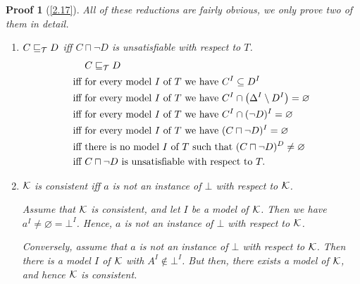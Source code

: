 \documentclass[openany]{scrbook}
\theoremstyle{break}
\theoremstyle{nonumberbreak}
\theoremstyle{nonumberplain}
\theoremstyle{nonumberbreak}
\newtheorem{Proof}{Proof}
\begin{document}
\begin{Proof}[\cref{2.17}]
  All of these reductions are fairly obvious, we only prove two of
  them in detail.
  \begin{enumerate}
  \item[3.] $C \sqsubseteq_{\cal T} D$ iff $C \sqcap \neg D$ is unsatisfiable
    with respect to $T$.
    \begin{align*}
      & C \sqsubseteq_{\cal T} D \\
      \text{iff}\ & \text{for every model}\ I\ \text{of}\ T\ \text{we
        have}\ C^I \subseteq D^I \\
      \text{iff}\ & \text{for every model}\ I\ \text{of}\ T\ \text{we
        have}\ C^I \cap \left(\Delta^I \setminus D^I\right) =
      \varnothing \\
      \text{iff}\ & \text{for every model}\ I\ \text{of}\ T\ \text{we
        have}\ C^I \cap (\neg D)^I = \varnothing \\
      \text{iff}\ & \text{for every model}\ I\ \text{of}\ T\ \text{we
        have}\ (C \sqcap \neg D)^I = \varnothing \\
      \text{iff}\ & \text{there is no model}\ I\ \text{of}\ T\
      \text{such that}\ (C \sqcap \neg D)^D \ne \varnothing \\
      \text{iff}\ & C \sqcap \neg D\ \text{is unsatisfiable with
        respect to}\ T.
    \end{align*}
  \item[7.] ${\cal K}$ is consistent iff $a$ is not an instance of
    $\bot$ with respect to ${\cal K}$.

    Assume that ${\cal K}$ is consistent, and let $I$ be a model of
    ${\cal K}$. Then we have $a^I \ne \varnothing = \bot^I$. Hence,
    $a$ is not an instance of $\bot$ with respect to ${\cal K}$.

    Conversely, assume that $a$ is not an instance of $\bot$ with
    respect to ${\cal K}$. Then there is a model $I$ of ${\cal K}$
    with $A^I \not\in \bot^I$. But then, there exists a model of ${\cal
      K}$, and hence ${\cal K}$ is consistent.
  \end{enumerate}
\end{Proof}
\end{document}

